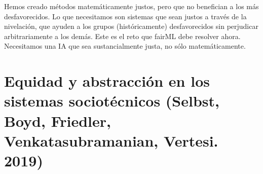 Hemos creado métodos matemáticamente justos, pero que no benefician a los más desfavorecidos. Lo que necesitamos son sistemas que sean justos a través de la nivelación, que ayuden a los grupos (históricamente) desfavorecidos sin perjudicar arbitrariamente a los demás. Este es el reto que fairML debe resolver ahora. Necesitamos una IA que sea sustancialmente justa, no sólo matemáticamente.


\chapter{Equidad y abstracción en los sistemas sociotécnicos (Selbst, Boyd, Friedler, Venkatasubramanian, Vertesi. 2019)}
